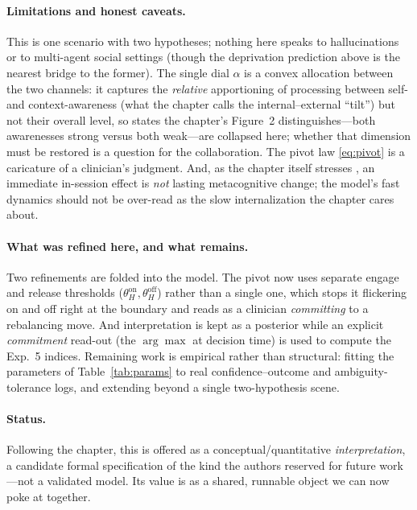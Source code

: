 \documentclass[11pt]{article}
\begin{document}
\paragraph{Limitations and honest caveats.} This is one scenario with two hypotheses; nothing here speaks to hallucinations or to multi-agent social settings (though the deprivation prediction above is the nearest bridge to the former). The single dial $\alpha$ is a convex allocation between the two channels: it captures the \emph{relative} apportioning of processing between self- and context-awareness (what the chapter calls the internal--external ``tilt'') but not their overall level, so states the chapter's Figure~2 distinguishes---both awarenesses strong versus both weak---are collapsed here; whether that dimension must be restored is a question for the collaboration. The pivot law \eqref{eq:pivot} is a caricature of a clinician's judgment. And, as the chapter itself stresses \citep[p.~10, \S4.1]{HanEtAL2025}, an immediate in-session effect is \emph{not} lasting metacognitive change; the model's fast dynamics should not be over-read as the slow internalization the chapter cares about.

\paragraph{What was refined here, and what remains.} Two refinements are folded into the model. The pivot now uses separate engage and release thresholds ($\theta_H^{\text{on}},\theta_H^{\text{off}}$) rather than a single one, which stops it flickering on and off right at the boundary and reads as a clinician \emph{committing} to a rebalancing move. And interpretation is kept as a posterior while an explicit \emph{commitment} read-out (the $\arg\max$ at decision time) is used to compute the Exp.~5 indices. Remaining work is empirical rather than structural: fitting the parameters of Table~\ref{tab:params} to real confidence--outcome and ambiguity-tolerance logs, and extending beyond a single two-hypothesis scene.

\paragraph{Status.} Following the chapter, this is offered as a conceptual/quantitative \emph{interpretation}, a candidate formal specification of the kind the authors reserved for future work---not a validated model. Its value is as a shared, runnable object we can now poke at together.
\end{document}
